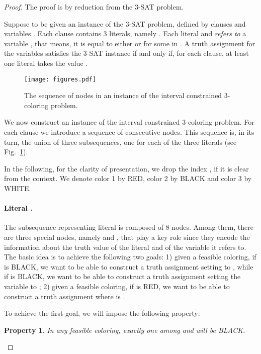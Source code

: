 \documentclass[a4paper,11pt]{article}
\theoremstyle{theorem}
\newtheorem{property}[theorem]{Property}
\begin{document}
\begin{proof}
The proof is by reduction from the 3-SAT problem.

\smallskip
\noindent Suppose to be given an instance of the 3-SAT problem, defined by  clauses  and  variables . Each clause   contains 3 literals, namely . Each literal
  and  \emph{refers to} a variable , that means, it is equal to either  or  for some  in . A truth assignment for the variables  satisfies the 3-SAT instance 
if and only if, for each clause, at least one literal takes the value .

\begin{figure}[htb]
\centering
\texttt{[image: figures.pdf]} 
\caption{The sequence of nodes in an instance of the interval constrained 3-coloring problem.}
\label{fig:1}
\end{figure}

We now construct an instance of the interval constrained 3-coloring problem.
For each clause  we introduce a sequence of consecutive nodes.
This sequence is, in its turn,  the union of three subsequences, one for each of the three literals (see Fig.~\ref{fig:1}).

In the following, for the clarity of presentation, we drop the index , if it is clear from the context. We denote color 1 by RED, color 2 by BLACK and color 3 by WHITE. 



\paragraph{Literal .}  The subsequence representing literal  is composed of 8 nodes. Among them, there are three special nodes, namely  and , that play a key role since they encode the information about the truth value of the literal and of the variable  it refers to. The basic idea is to achieve the following two goals: 1) given a feasible coloring, if  is BLACK, we want to be able to construct a truth assignment setting  to , while if  is BLACK, we want to be able to construct a truth assignment setting the variable  to ; 2) given a feasible coloring, if  is RED, we want to be able to construct a truth assignment where  is .

To achieve the first goal, we will impose the following property: 

\begin{property}\label{(i)}
In any feasible coloring, exactly one among  and  will be BLACK.
\end{property}


\end{proof}
\end{document}

